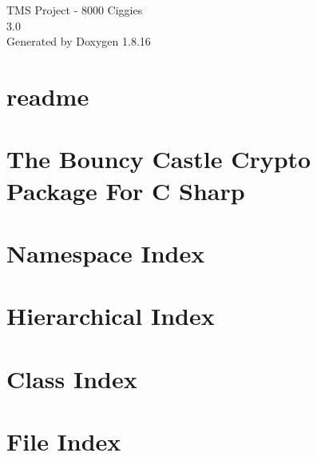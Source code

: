 \let\mypdfximage\pdfximage\def\pdfximage{\immediate\mypdfximage}\documentclass[twoside]{book}
\newcommand{\+}{\discretionary{\mbox{\scriptsize$\hookleftarrow$}}{}{}}
\newcommand{\clearemptydoublepage}{%
  \newpage{\pagestyle{empty}\cleardoublepage}%
}
\begin{document}
\hypersetup{pageanchor=false,
             bookmarksnumbered=true,
             pdfencoding=unicode
            }
\begin{titlepage}
\vspace*{7cm}
\begin{center}%
{\Large T\+MS Project -\/ 8000 Ciggies \\[1ex]\large 3.\+0 }\\
\vspace*{1cm}
{\large Generated by Doxygen 1.8.16}\\
\end{center}
\end{titlepage}
\clearemptydoublepage
{}
\tableofcontents
\clearemptydoublepage
{}
\hypersetup{pageanchor=true}

\chapter{readme}
\label{md__c_1__users__school__user__code__t_m_s-_dump_readme}

\chapter{The Bouncy Castle Crypto Package For C Sharp}
\label{md__c_1__users__school__user__code__t_m_s-_dump__transport__management__system__w_p_f_packages__bb4bf1c016a2490d0cd8a96342590661}

\chapter{Namespace Index}

\chapter{Hierarchical Index}

\chapter{Class Index}

\chapter{File Index}

\end{document}
